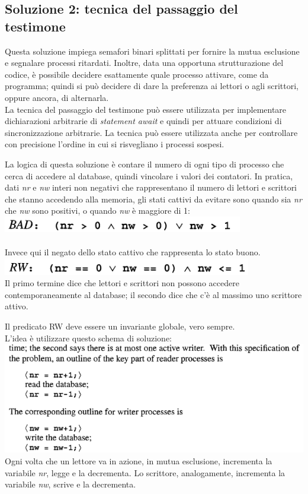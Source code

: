 \documentclass[10pt,a4paper]{book}
\begin{document}
\subsection{Soluzione 2: tecnica del passaggio del testimone}
Questa soluzione impiega semafori binari splittati per fornire la mutua esclusione e segnalare processi ritardati. Inoltre, data una opportuna strutturazione del codice, è possibile decidere esattamente quale processo attivare, come da programma; quindi si può decidere di dare la preferenza ai lettori o agli scrittori, oppure ancora, di alternarla.\\
La tecnica del passaggio del testimone può essere utilizzata per implementare dichiarazioni arbitrarie di \textit{statement await} e quindi per attuare condizioni di sincronizzazione arbitrarie. La tecnica può essere utilizzata anche per controllare con precisione l'ordine in cui si risvegliano i processi sospesi.

La logica di questa soluzione è contare il numero di ogni tipo di processo che cerca di accedere al database, quindi vincolare i valori dei contatori. In pratica, dati \textit{nr} e \textit{nw} interi non negativi che rappresentano il numero di lettori e scrittori che stanno accedendo alla memoria, gli stati cattivi da evitare sono quando sia \textit{nr} che \textit{nw} sono positivi, o quando \textit{nw} è maggiore di 1: \\
\includegraphics[scale=0.41]{img/baton.png} \\ \\
Invece qui il negato dello stato cattivo che rappresenta lo stato buono. \\ 
\includegraphics[scale=0.41]{img/baton2.png} \\
Il primo termine dice che lettori e scrittori non possono accedere contemporaneamente al database; il secondo dice che c'è al massimo uno scrittore attivo.

Il predicato RW deve essere un invariante globale, vero sempre.\\

L'idea è utilizzare questo schema di soluzione:\\
\includegraphics[scale=0.41]{img/baton3.png} \\
Ogni volta che un lettore va in azione, in mutua esclusione, incrementa la variabile \textit{nr}, legge e la decrementa.
Lo scrittore, analogamente, incrementa la variabile \textit{nw}, scrive e la decrementa.
\end{document}
